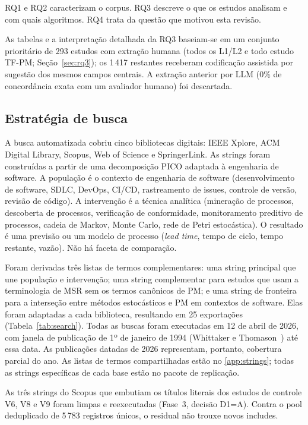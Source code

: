 \documentclass[preprint,12pt,authoryear=false]{elsarticle}
\newcommand{\PM}{TF-PM}
\begin{document}
RQ1 e RQ2 caracterizam o corpus. RQ3 descreve o que os estudos analisam e com quais algoritmos. RQ4 trata da questão que motivou esta revisão.

As tabelas e a interpretação detalhada da RQ3 baseiam-se em um conjunto prioritário de 293 estudos com extração humana (todos os L1/L2 e todo estudo \PM{}; Seção~\ref{sec:rq3}); os 1\,417 restantes receberam codificação assistida por sugestão dos mesmos campos centrais. A extração anterior por LLM (0\% de concordância exata com um avaliador humano) foi descartada.

\subsection{Estratégia de busca}\label{sec:search}

A busca automatizada cobriu cinco bibliotecas digitais: IEEE Xplore, ACM Digital Library, Scopus, Web of Science e SpringerLink. As strings foram construídas a partir de uma decomposição PICO adaptada à engenharia de software. A população é o contexto de engenharia de software (desenvolvimento de software, SDLC, DevOps, CI/CD, rastreamento de issues, controle de versão, revisão de código). A intervenção é a técnica analítica (mineração de processos, descoberta de processos, verificação de conformidade, monitoramento preditivo de processos, cadeia de Markov, Monte Carlo, rede de Petri estocástica). O resultado é uma previsão ou um modelo de processo (\emph{lead time}, tempo de ciclo, tempo restante, vazão). Não há faceta de comparação.

Foram derivadas três listas de termos complementares: uma string principal que une população e intervenção; uma string complementar para estudos que usam a terminologia de MSR sem os termos canônicos de PM; e uma string de fronteira para a interseção entre métodos estocásticos e PM em contextos de software. Elas foram adaptadas a cada biblioteca, resultando em 25 exportações (Tabela~\ref{tab:search}). Todas as buscas foram executadas em 12 de abril de 2026, com janela de publicação de 1º de janeiro de 1994 (Whittaker e Thomason~\cite{whittaker1994}) até essa data. As publicações datadas de 2026 representam, portanto, cobertura parcial do ano. As listas de termos compartilhadas estão no \ref{app:strings}; todas as strings específicas de cada base estão no pacote de replicação.

As três strings do Scopus que embutiam os títulos literais dos estudos de controle V6, V8 e V9 foram limpas e reexecutadas (Fase~3, decisão D1=A). Contra o pool deduplicado de 5\,783 registros únicos, o residual não trouxe novos includes.
\end{document}
